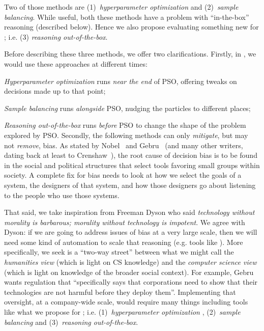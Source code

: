  Two of those methods are (1)~{\em hyperparameter optimization}
 and (2)~{\em sample balancing}. While useful,  both these methods have
         a problem with ``in-the-box'' reasoning (described below).
         Hence we also propose evaluating something  new for
  ; i.e.  (3) {\em reasoning  out-of-the-box}. 
 
 Before describing these three methods, we offer two clarifications.  
 Firstly, in , we would use these approaches at   different times:
 \be
 \item {\em Hyperparameter optimization} runs {\em near the end} of PSO, offering tweaks on   decisions made up to that point;
 \item {\em Sample balancing} runs {\em alongside} PSO, 
 nudging the particles to different places;
 \item  {\em Reasoning out-of-the-box}   runs {\em before} PSO to  change the shape
 of the problem explored by PSO.
 \ee
Secondly,    the following methods can only {\em mitigate}, but may not  {\em remove}, bias.
As stated by  Nobel~\cite{noble2018algorithms} and   Gebru~\cite{gebru21} 
(and many other writers, dating back at least to Crenshaw~\cite{crenshaw2017race}), the root cause of decision
bias is to be found in the social and political structures that select tools favoring small groups within
society. A complete fix for bias   needs to look
at how we select the goals of a system, the designers of that system, and how those designers   go about listening to the people
who use those systems. 

That said, we take   inspiration from Freeman Dyson who   said
{\em technology without morality is barbarous; morality without technology is impotent}. We agree with Dyson: 
if 
we are going to address issues of bias at a very large scale, then we will need some kind of automation to scale that reasoning (e.g. tools like ). More specifically, we seek is a ``two-way street'' between what we might call the {\em humanities view} (which is light on CS knowledge) and the {\em computer science view} (which is light on knowledge of the broader social context). For example, 
Gebru~\cite{adams21a}
wants regulation that ``specifically says that corporations need to show that their technologies are not harmful before they deploy them''.
Implementing that   oversight, at a company-wide scale, would
require many things including tools like what we propose for ; i.e.
(1)~{\em hyperparameter optimization} ,  (2)~{\em sample balancing} 
and (3)~{\em reasoning out-of-the-box}.
  

